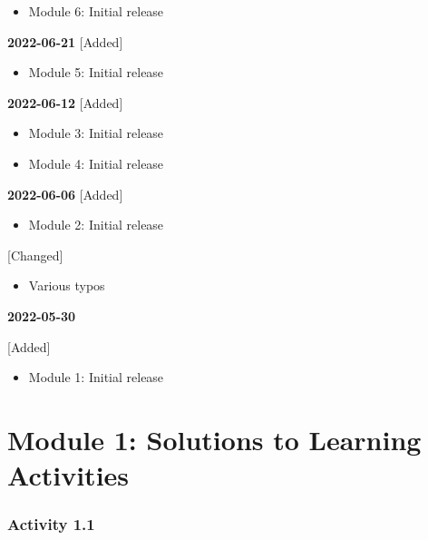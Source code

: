 \documentclass[
]{memoir}
\providecommand{\tightlist}{%
  \setlength{\itemsep}{0pt}\setlength{\parskip}{0pt}}
\begin{document}
\begin{itemize}
\tightlist
\item
  Module 6: Initial release
\end{itemize}

\textbf{2022-06-21}
{[}Added{]}

\begin{itemize}
\tightlist
\item
  Module 5: Initial release
\end{itemize}

\textbf{2022-06-12}
{[}Added{]}

\begin{itemize}
\tightlist
\item
  Module 3: Initial release
\item
  Module 4: Initial release
\end{itemize}

\textbf{2022-06-06}
{[}Added{]}

\begin{itemize}
\tightlist
\item
  Module 2: Initial release
\end{itemize}

{[}Changed{]}

\begin{itemize}
\tightlist
\item
  Various typos
\end{itemize}

\textbf{2022-05-30}

{[}Added{]}

\begin{itemize}
\tightlist
\item
  Module 1: Initial release
\end{itemize}

\hypertarget{module-1-solutions-to-learning-activities}{%
\chapter*{Module 1: Solutions to Learning Activities}\label{module-1-solutions-to-learning-activities}}

\hypertarget{activity-1.1}{%
\subsection*{Activity 1.1}\label{activity-1.1}}
\end{document}
